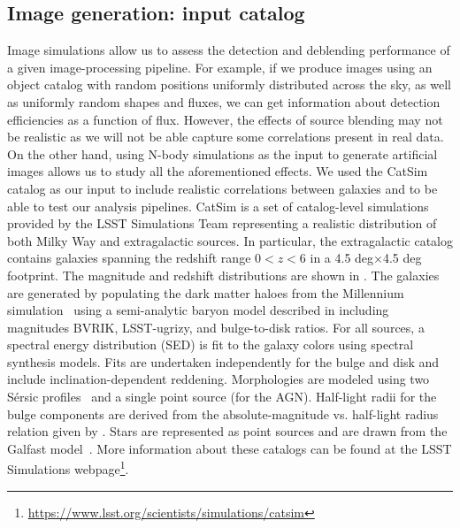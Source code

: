\documentclass[\docopts]{\docclass}
\begin{document}
\subsection{Image generation: input catalog}
\label{sec:inputs}
Image simulations allow us to assess the detection and deblending performance of a given image-processing pipeline. For example, if we produce images using an object catalog with random positions uniformly distributed across the sky, as well as uniformly random shapes and fluxes, we can get information about detection efficiencies as a function of flux. However, the effects of source blending may not be realistic as we will not be able capture some correlations present in real data. On the other hand, using N-body simulations as the input to generate artificial images allows us to study all the aforementioned effects. We used the CatSim~\citep{2010SPIE.7738E..1OC,2014SPIE.9150E..14C} catalog as our input to include realistic correlations between galaxies and to be able to test our analysis pipelines. CatSim is a set of catalog-level simulations provided by the LSST Simulations Team representing a realistic distribution of both Milky Way and extragalactic sources. In particular, the extragalactic catalog contains galaxies spanning the redshift range $0 < z < 6$ in a 4.5 deg$\times$4.5 deg footprint. The magnitude and redshift distributions are shown in . The galaxies are generated by populating the dark matter haloes from the Millennium simulation~\citep{2005Nature.435.629S} using a semi-analytic baryon model described in \citet{2006MNRAS.366..499D} including magnitudes BVRIK, LSST-ugrizy, and bulge-to-disk ratios. For all sources, a spectral energy distribution (SED) is fit to the galaxy colors using \citet{2003MNRAS.344.1000B} spectral synthesis models. Fits are undertaken independently for the bulge and disk and include inclination-dependent reddening. Morphologies are modeled using two S\'{e}rsic profiles~\citep{1963BAAA....6...41S} and a single point source (for the AGN). Half-light radii for the bulge components are derived from the absolute-magnitude vs. half-light radius relation given by \citet{2011A&A...534A...3G}. Stars are represented as point sources and are drawn from the Galfast model~\citep{2008ApJ...673..864J}. More information about these catalogs can be found at the LSST Simulations webpage\footnote{\url{https://www.lsst.org/scientists/simulations/catsim}}.
\end{document}

